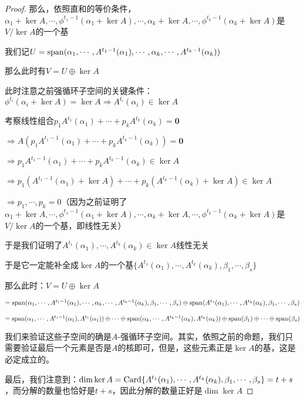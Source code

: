 \documentclass[12pt, a4paper, oneside, UTF8]{ctexbook}
\begin{document}
\begin{proof}
				那么，依照直和的等价条件，$\alpha_1+\ker A,\cdots,\phi^{t_1-1}(\alpha_1+\ker A),\cdots,\alpha_k+\ker A,\cdots,\phi^{t_k-1}(\alpha_k+\ker A)$是$V/\ker A$的一个基

				我们记$U = \operatorname{span}(\alpha_1,\cdots,A^{t_1-1}(\alpha_1),\cdots,\alpha_k,\cdots,A^{t_k-1}(\alpha_k))$

				那么此时有$V = U \oplus \ker A$

				此时注意之前强循环子空间的关键条件：$\phi ^{t_i}(\alpha_i+\ker A)=\ker A \Rightarrow A^{t_i}(\alpha_i) \in \ker A$

				考察线性组合$p_1 A^{t_1}(\alpha_1)+\cdots+p_k A^{t_k}(\alpha_k)=\mathbf{0}$

				$\Rightarrow A(p_1 A^{t_1-1}(\alpha_1)+\cdots+p_k A^{t_k-1}(\alpha_k))=\mathbf{0}$

				$\Rightarrow p_1 A^{t_1-1}(\alpha_1)+\cdots+p_k A^{t_k-1}(\alpha_k) \in \ker A$

				$\Rightarrow p_1 (A^{t_1-1}(\alpha_1)+\ker A)+\cdots+p_k (A^{t_k-1}(\alpha_k)+\ker A) \in \ker A$

				$\Rightarrow p_1,\cdots,p_k = 0$（因为之前证明了$\alpha_1+\ker A,\cdots,\phi^{t_1-1}(\alpha_1+\ker A),\cdots,\alpha_k+\ker A,\cdots,\phi^{t_k-1}(\alpha_k+\ker A)$是$V/\ker A$的一个基，即线性无关）

				于是我们证明了$A^{t_1}(\alpha_1),\cdots,A^{t_k}(\alpha_k) \in \ker A$线性无关

				于是它一定能补全成$\ker A$的一个基$\{A^{t_1}(\alpha_1),\cdots,A^{t_k}(\alpha_k),\beta_1,\cdots,\beta_s\}$

				那么此时：$V = U \oplus \ker A$

				$= \operatorname{span}(\alpha_1,\cdots,A^{t_1-1}(\alpha_1),\cdots,\alpha_k,\cdots,A^{t_k-1}(\alpha_k),\beta_1,\cdots,\beta_s) \oplus \operatorname{span}(A^{t_1}(\alpha_1),\cdots,A^{t_k}(\alpha_k),\beta_1,\cdots,\beta_s)$

				$= \operatorname{span}(\alpha_1,\cdots,A^{t_1-1}(\alpha _1),A^{t_1}(\alpha_1)) \oplus \cdots \oplus \operatorname{span}(\alpha_k,\cdots,A^{t_k-1}(\alpha_k),A^{t_k}(\alpha_k)) \oplus \operatorname{span}(\beta_1) \oplus \cdots \oplus \operatorname{span}(\beta_s)$

				我们来验证这些子空间的确是$A$-强循环子空间。其实，依照之前的命题，我们只需要验证最后一个元素是否是$A$的核即可，但是，这些元素正是$\ker A$的基，这是必定成立的。

				最后，我们注意到：$\dim \ker A = \operatorname{Card}\{A^{t_1}(\alpha_1),\cdots,A^{t_k}(\alpha_k),\beta_1,\cdots,\beta_s\}=t+s$，而分解的数量也恰好是$t+s$，因此分解的数量正好是$\dim \ker A$
			\end{proof}
\end{document}
